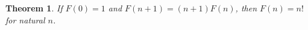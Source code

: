 \documentclass{article}
\newtheorem{theorem}{Theorem}
\begin{document}
\begin{theorem}\label{thm:G01}
If $F(0)=1$ and $F(n+1)=(n+1)F(n)$, then $F(n)=n!$ for natural $n$.
\end{theorem}
\end{document}
